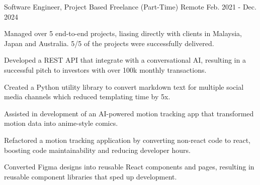 

\begin{cventries}

  \cventry
    {Software Engineer, Project Based} %
    {Freelance (Part-Time)} %
    {Remote} %
    {Feb. 2021 - Dec. 2024} %
    {
      \begin{cvitems} %
        \item {Managed over 5 end-to-end projects, liasing directly with clients in Malaysia, Japan and Australia. 5/5 of the projects were successfully delivered.}
        \item {Developed a REST API that integrate with a conversational AI, resulting in a successful pitch to investors with over 100k monthly transactions.}
        \item {Created a Python utility library to convert markdown text for multiple social media channels which reduced templating time by 5x.}
        \item {Assisted in development of an AI-powered motion tracking app that transformed motion data into anime-style comics.}
        \item {Refactored a motion tracking application by converting non-react code to react, boosting code maintainability and reducing developer hours.}
        \item {Converted Figma designs into reusable React components and pages, resulting in reusable component libraries that sped up development.}
      \end{cvitems}
    }


\end{cventries}
